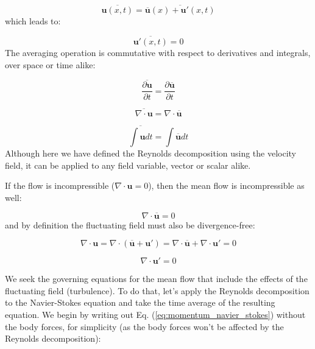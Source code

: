 \documentclass[12pt]{article}
\numberwithin{equation}{section}
\numberwithin{figure}{section}
\numberwithin{table}{section}
\begin{document}
\begin{equation}
  \overline{\mathbf{u}(x, t)} = \overline{\overline{\mathbf{u}}(x) + \mathbf{u}'(x, t)}
\end{equation}
which leads to:

\begin{equation}
  \overline{\mathbf{u}'(x, t)} = 0
\end{equation}
The averaging operation is commutative with respect to derivatives and integrals,
over space or time alike:

\begin{equation}
  \overline{\frac{\partial \mathbf{u}}{\partial t}} = \frac{\partial \overline{\mathbf{u}}}{\partial t}
\end{equation}

\begin{equation}
  \overline{\nabla \cdot \mathbf{u}} = \nabla \cdot \overline{\mathbf{u}}
\end{equation}

\begin{equation}
  \overline{\int \mathbf{u} dt} = \int \overline{\mathbf{u}} dt
\end{equation}
Although here we have defined the Reynolds decomposition using the velocity
field, it can be applied to any field variable, vector or scalar alike.

If the flow is incompressible ($\nabla \cdot \mathbf{u} = 0$), then the mean
flow is incompressible as well:

\begin{equation}
  \nabla \cdot \overline{\mathbf{u}} = 0
\end{equation}
and by definition the fluctuating field must also be divergence-free:

\begin{equation}
  \nabla \cdot \mathbf{u} = \nabla \cdot (\overline{\mathbf{u}} + \mathbf{u}') =
  \nabla \cdot \overline{\mathbf{u}} + \nabla \cdot \mathbf{u}' = 0
\end{equation}

\begin{equation}
  \nabla \cdot \mathbf{u}' = 0
\end{equation}

We seek the governing equations for the mean flow that include the effects of
the fluctuating field (turbulence).
To do that, let's apply the Reynolds decomposition to the Navier-Stokes equation
and take the time average of the resulting equation.
We begin by writing out Eq. (\ref{eq:momentum_navier_stokes}) without the
body forces, for simplicity (as the body forces won't be affected by the
Reynolds decomposition):
\end{document}
